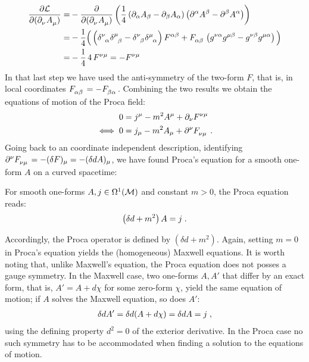 \begin{align}
\frac{\partial \Ldens}{\partial(\partial\indices{_\nu} A\indices{_\mu})}
=& -\frac{\partial }{\partial(\partial\indices{_\nu} A\indices{_\mu})} \left( \frac{1}{4} \left(  \partial_\alpha A_\beta - \partial_\beta A_\alpha \right) \left(  \partial^\alpha A^\beta - \partial^\beta A^\alpha \right)   \right) \notag \\
=&  -\frac{1}{4} \Big( \left( \delta\indices{^\nu_\alpha}  \delta\indices{^\mu_\beta} -  \delta\indices{^\nu_\beta}  \delta\indices{^\mu_\alpha} \right ) F\indices{^{\alpha\beta}} + F\indices{_{\alpha\beta}} \left( g\indices{^{\nu \alpha}} g\indices{^{\mu \beta}} - g\indices{^{\nu \beta}} g\indices{^{\mu \alpha}}  \right ) \Big) \notag  \\
 =& -\frac{1}{4} \,4 \, F\indices{^{\nu\mu}} =- F\indices{^{\nu\mu}}  \formspace
\end{align}
In that last step we have used the anti-symmetry of the two-form $F$, that is, in local coordinates $F\indices{_{\alpha\beta}}  = - F\indices{_{\beta\alpha}}$.
%
Combining the two results we obtain the equations of motion of the Proca field:
\begin{align}
0 &=  j^\mu - m^2 A^\mu  + \partial_{\nu} F\indices{^{\nu\mu}}\notag \\
\iff 0 &=  j_\mu - m^2 A_\mu  + \partial^{\nu} F\indices{_{\nu\mu}} \formspace.
\end{align}
Going back to an coordinate independent description, identifying $\partial^{\nu} F\indices{_{\nu\mu}} = -(\delta F)_\mu = -(\delta d A)_\mu$, we have found Proca's equation for a smooth one-form $A$ on a curved spacetime:
%
\begin{definition}\label{def:proca_operator}
For smooth one-forms $A,j \in \Omega^1(\mathcal{M})$ and constant $m>0$, the Proca equation reads:
\begin{align}
\left( \delta d + m^2 \right) A = j \;.\label{eqn:Proca}
\end{align}
\end{definition}
Accordingly, the Proca operator is defined by $(\delta d + m^2)$. Again, setting $m=0$ in Proca's equation  yields the (homogeneous) Maxwell equations. It is worth noting that, unlike Maxwell's equation, the Proca equation does not posses a gauge symmetry. In the Maxwell case, two one-forms $A, A'$ that differ by an exact form, that is, $A' = A + d \chi$ for some zero-form $\chi$, yield the same equation of motion; if $A$ solves the Maxwell equation, so does $A'$:
\begin{align}
	\delta d A' = \delta d(A + d \chi) = \delta d A =j \;,
\end{align}
using the defining property $d^2 = 0$ of the exterior derivative. In the Proca case no such symmetry has to be accommodated when finding a solution to the equations of motion.
%
%
%
%
%
%
